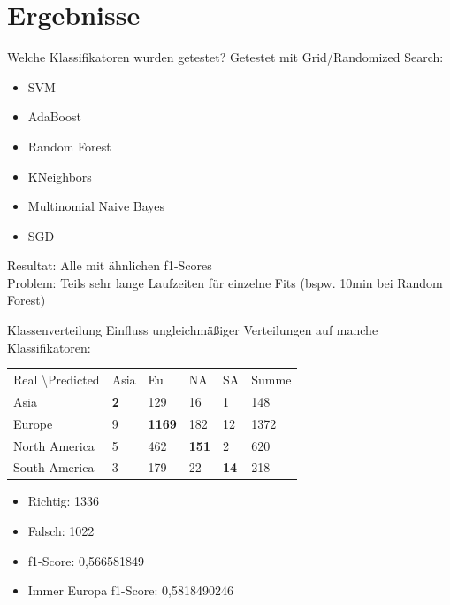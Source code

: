 \documentclass[12pt]{beamer}
\begin{document}
\section{Ergebnisse}
\begin{frame}[fragile]{Welche Klassifikatoren wurden getestet?}
	Getestet mit Grid/Randomized Search:
	\begin{itemize}
		\item SVM 
		\item AdaBoost
		\item Random Forest
		\item KNeighbors
		\item Multinomial Naive Bayes
		\item SGD
	\end{itemize}

	Resultat: Alle mit ähnlichen f1-Scores \\
	Problem: Teils sehr lange Laufzeiten für einzelne Fits (bspw. 10min bei Random Forest)
\end{frame}

\begin{frame}[fragile]{Klassenverteilung}
	Einfluss ungleichmäßiger Verteilungen auf manche Klassifikatoren: \\
	\medskip
	\begin{tabular}{|l|l|l|l|l|l|}
		\hline
		Real \textbackslash Predicted & Asia & Eu & NA & SA & Summe\\
		Asia & \textbf{2} & 129 & 16 & 1 & 148 \\
		Europe & 9 & \textbf{1169} & 182 & 12 & 1372 \\
		North America & 5 & 462 & \textbf{151} &2 & 620 \\
		South America & 3 & 179 & 22 & \textbf{14} & 218 \\
		\hline
	\end{tabular}
	
	\begin{multicols}{2}
		\begin{itemize}
			\item Richtig: 1336
			\item Falsch: 1022
			\medskip
			\item f1-Score: 0,566581849
			\item Immer Europa f1-Score: 0,5818490246
		\end{itemize}	
	\end{multicols}			
\end{frame}
\end{document}
